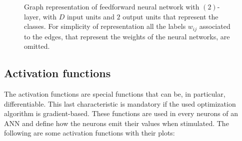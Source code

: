 \begin{figure}[h]
{}
	\caption[Graph representation of feedforward neural network.]{Graph representation of feedforward neural network with $(2)$-layer, with $D$ input units and $2$ output units that represent the classes. For simplicity of representation all the labels $w_{ij}$ associated to the edges, that represent the weights of the neural networks, are omitted.}
	\label{fig:multilayer-perceptron}
\end{figure}
\FloatBarrier

\subsection{Activation functions}\label{sec:activation-functions}
The activation functions are special functions that can be, in particular, differentiable. This last characteristic is mandatory if the used optimization algorithm is gradient-based. These functions are used in every neurons of an ANN and define how the neurons emit their values when stimulated. The following are some activation functions with their plots:

